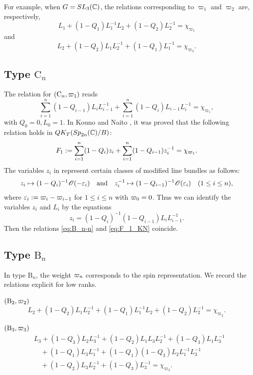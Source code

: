 \documentclass{amsart}
\numberwithin{equation}{section}
\begin{document}
For example, when \(G=SL_3 (\mathbb{C})\), the relations corresponding to
\(\varpi_1\) and \(\varpi_2\) are, respectively,
\[
L_1+(1-Q_1)L_1^{-1}L_2+(1-Q_2)L_2^{-1}
=
\chi_{\varpi_1}
\]
and
\[
L_2+(1-Q_2)L_1L_2^{-1}+(1-Q_1)L_1^{-1}
=
\chi_{\varpi_2}.
\]



\subsection{Type \(\mathrm C_n\)}
The relation for 
$(\mathrm{C}_n,{\varpi_{1}})$ reads
\begin{equation}
\sum_{i=1}^n
(1-Q_{i-1})L_iL_{i-1}^{-1}
+
\sum_{i=1}^n
(1-Q_i)L_{i-1}L_i^{-1}
=
\chi_{\varpi_1},
\label{eq:B_n-n}
\end{equation}
with $Q_0=0, L_0=1.$ In 
Kouno and Naito \cite{KN},
it was proved that the following relation holds in $QK_T({Sp}_{2n} (\mathbb{C}) /B)$:
\begin{equation}
F_1:=\sum_{i=1}^n(1-Q_i)z_i
+\sum_{i=1}^n(1-Q_{i-1})z_i^{-1}=\chi_{{\varpi_{1}}}.
\label{eq:F_1_KN}
\end{equation}
The variables $z_i$ in \cite[\S~6.2]{KN} represent 
certain classes of modified line bundles as follows:
\begin{equation}
z_i\mapsto (1-Q_i)^{-1}\mathscr{O}(-\varepsilon_i)\quad\text{and}
\quad
z_i^{-1}\mapsto (1-Q_{i-1})^{-1}\mathscr{O}(\varepsilon_i)\quad (1\le i\le n),
\end{equation}
where $\varepsilon_{i} := {\varpi_{i}} - {\varpi_{i-1}}$ for $1 \le i \le n$ with ${\varpi_{0}} = 0$. 
Thus we can identify 
the variables $z_i$ and $L_i$ by the equations
\begin{equation}
 z_i=({1-Q_i})^{-1}{(1-Q_{i-1})}
{L_i}L_{i-1}^{-1}.
\end{equation}
Then 
the relations \eqref{eq:B_n-n}
and \eqref{eq:F_1_KN}
coincide.


\subsection{Type $\mathrm{B}_n$}
In type $\mathrm{B}_n$, 
the weight ${\varpi_{n}}$ corresponds to the spin representation.
We record the relations explicit for low
ranks. 
\begin{example}
$(\mathrm{B}_2,{\varpi_{2}})$
\[L_2
+(1-Q_2)L_1L_2^{-1}
+(1-Q_1)L_1^{-1}L_2
+(1-Q_2)L_2^{-1}
=
\chi_{\varpi_2}.\]
\end{example}
\begin{example}
$(\mathrm{B}_3,{\varpi_{3}})$
\[
\begin{aligned}
&
L_3
+(1-Q_3)L_2L_3^{-1}
+(1-Q_2)L_1L_3L_2^{-1}
+(1-Q_3)L_1L_3^{-1} \\
&\quad
+(1-Q_1)L_3L_1^{-1}
+(1-Q_1)(1-Q_3)L_2L_1^{-1}L_3^{-1} \\
&\quad
+(1-Q_2)L_3L_2^{-1}
+(1-Q_3)L_3^{-1}
=
\chi_{\varpi_3}.
\end{aligned}
\]    
\end{example}
\end{document}

